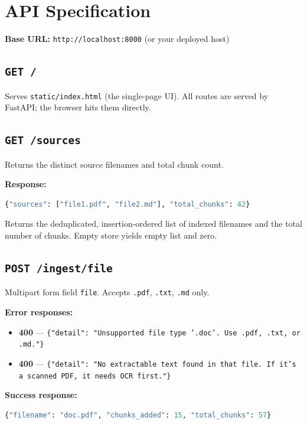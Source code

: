 \documentclass[11pt,a4paper]{paper}
\begin{document}
\section{API Specification}
\label{sec:api}

\textbf{Base URL:} \texttt{http://localhost:8000} (or your deployed host)

\subsection{\texttt{GET /}}

Serves \texttt{static/index.html} (the single-page UI). All routes are served by FastAPI; the browser hits them directly.

\subsection{\texttt{GET /sources}}

Returns the distinct source filenames and total chunk count.

\textbf{Response:}
\begin{lstlisting}[language=Python, style=jsonstyle, caption={GET /sources response.}, label=lst:api-sources]
{"sources": ["file1.pdf", "file2.md"], "total_chunks": 42}
\end{lstlisting}

Returns the deduplicated, insertion-ordered list of indexed filenames and the total number of chunks. Empty store yields empty list and zero.

\subsection{\texttt{POST /ingest/file}}

Multipart form field \texttt{file}. Accepts \texttt{.pdf}, \texttt{.txt}, \texttt{.md} only.

\textbf{Error responses:}
\begin{itemize}
  \item \textbf{400} — \texttt{\{"detail": "Unsupported file type '.doc'. Use .pdf, .txt, or .md."\}}
  \item \textbf{400} — \texttt{\{"detail": "No extractable text found in that file. If it's a scanned PDF, it needs OCR first."\}}
\end{itemize}

\textbf{Success response:}
\begin{lstlisting}[language=Python, style=jsonstyle, caption={POST /ingest/file response.}, label=lst:api-ingest]
{"filename": "doc.pdf", "chunks_added": 15, "total_chunks": 57}
\end{lstlisting}
\end{document}
